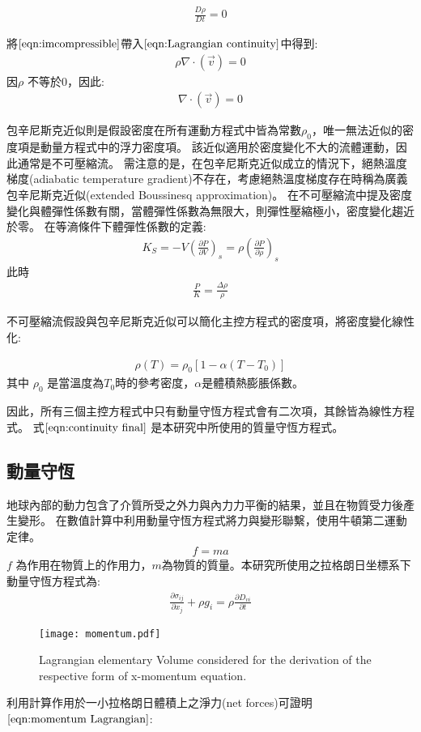 \begin{align}
\frac{D\rho}{Dt} = 0 \label{eqn:imcompressible}
\end{align}

將$\ref{eqn:imcompressible}$帶入$\ref{eqn:Lagrangian continuity}$中得到:
\begin{align}
\rho \nabla\cdot(\vec v) = 0
\end{align}
因$\rho$ 不等於0，因此:
\begin{align}
\nabla\cdot(\vec v) = 0 \label{eqn:continuity final}
\end{align}


包辛尼斯克近似則是假設密度在所有運動方程式中皆為常數$\rho_0$，唯一無法近似的密度項是動量方程式中的浮力密度項。
該近似適用於密度變化不大的流體運動，因此通常是不可壓縮流。
需注意的是，在包辛尼斯克近似成立的情況下，絕熱溫度梯度(adiabatic temperature gradient)不存在，考慮絕熱溫度梯度存在時稱為廣義包辛尼斯克近似(extended Boussinesq approximation)。
在不可壓縮流中提及密度變化與體彈性係數有關，當體彈性係數為無限大，則彈性壓縮極小，密度變化趨近於零。
在等滳條件下體彈性係數的定義:
\begin{align}
K_S = -V(\frac{\partial P}{\partial V})_s = \rho(\frac{\partial P}{\partial \rho})_s
\end{align}
此時
\begin{align}
\frac{P}{K} = \frac{\Delta \rho}{\rho}
\end{align}


不可壓縮流假設與包辛尼斯克近似可以簡化主控方程式的密度項，將密度變化線性化:

\begin{align}
\rho (T) = \rho_0[1-\alpha (T-T_0)] 
\end{align}
其中 $\rho_0$ 是當溫度為$T_0$時的參考密度，$\alpha$是體積熱膨脹係數。

因此，所有三個主控方程式中只有動量守恆方程式會有二次項，其餘皆為線性方程式。
式$\ref{eqn:continuity final}$ 是本研究中所使用的質量守恆方程式。

\subsection{動量守恆}


地球內部的動力包含了介質所受之外力與內力力平衡的結果，並且在物質受力後產生變形。
在數值計算中利用動量守恆方程式將力與變形聯繫，使用牛頓第二運動定律。
\begin{align}
f=ma
\end{align}
$f$ 為作用在物質上的作用力，$m$為物質的質量。本研究所使用之拉格朗日坐標系下動量守恆方程式為:
\begin{align}
\frac{\partial \sigma_{ij}}{\partial x_j}+\rho g_i = \rho \frac{\partial D_{vi}}{\partial t}\label{eqn:momentum Lagrangian}
\end{align}
\begin{figure*}[ht!]
    \centering
    \texttt{[image: momentum.pdf]}
    \caption{ Lagrangian elementary Volume considered for the derivation of the respective form of x-momentum equation.}
    \label{fig::Lagrangian Volume Momentum}
\end{figure*}
利用計算作用於一小拉格朗日體積上之淨力(net forces)可證明$\ref{eqn:momentum Lagrangian}$:

